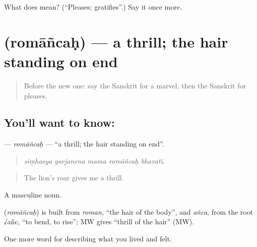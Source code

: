 \begin{tcolorbox}[breakable,colback=teal!4,colframe=teal!35!black,title={Before you move on}]
What does  mean? (\textquotedblleft{}Pleases; gratifies\textquotedblright{}.) Say it once more.
\end{tcolorbox}
\section[\texorpdfstring{\sk{रोमाञ्चः} (romāñcaḥ)}{रोमाञ्चः (romāñcaḥ)}]{ (romāñcaḥ) — a thrill; the hair standing on end}

\label{lesson:SA-C449-romancah}



\begin{quote}
Before the new one: say the Sanskrit for a marvel, then the Sanskrit for pleases.
\end{quote}

\subsection*{You'll want to know: }
\textbf{} — \emph{romāñcaḥ} — \textquotedblleft{}a thrill; the hair standing on end\textquotedblright{}.

\begin{quote}
    
\end{quote}

\begin{quote}
\emph{siṃhasya garjanena mama romāñcaḥ bhavati.}
\end{quote}

\begin{quote}
The lion's roar gives me a thrill.
\end{quote}

A masculine noun.

\begin{cousinweb}
\textbf{} (\emph{romāñcaḥ}) is built from \emph{roman}, \textquotedblleft{}the hair of the body\textquotedblright{}, and \emph{añca}, from the root √añc, \textquotedblleft{}to bend, to rise\textquotedblright{}; MW gives \textquotedblleft{}thrill of the hair\textquotedblright{} (MW).
\end{cousinweb}

\begin{grammarlens}[title={What you've built}]
One more word for describing what you lived and felt.
\end{grammarlens}

